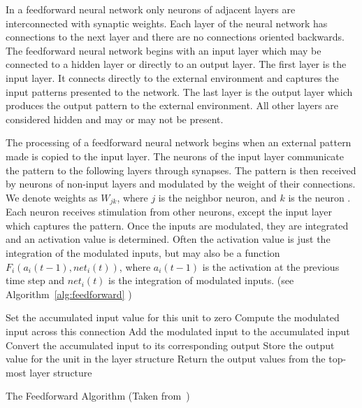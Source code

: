 \documentclass[11pt]{article}
\begin{document}
In a feedforward neural network only neurons of adjacent layers are interconnected with synaptic weights. Each layer of the neural
network has connections to the next layer and there are no connections oriented backwards. The feedforward neural network begins with an
input layer which may be connected to a hidden layer or directly to an output layer. The first layer is the input layer. It connects
directly to the external environment and captures the input patterns presented to the network. The last layer is the output layer which
produces the output pattern to the external environment. All other layers are considered hidden and may or may not be present.

The processing of a feedforward neural network begins when an external pattern made is copied to the input layer. The neurons of the
input layer communicate the pattern to the following layers through synapses. The pattern is then received by neurons of non-input
layers and modulated by the weight of their connections. We denote weights as $W_{jk}$, where $j$ is the neighbor neuron, and $k$ is the
neuron . Each neuron receives stimulation from other neurons, except the input layer which captures the pattern. Once the inputs are
modulated, they are integrated and an activation value is determined. Often the activation value is just the integration of the
modulated inputs, but may also be a function $F_{i}(a_{i}(t-1), net_{i}(t))$, where $a_{i}(t-1)$ is the activation at the previous time
step and $net_{i}(t)$ is the integration of modulated inputs. (see Algorithm~\ref{alg:feedforward}
)

\begin{algorithm}%
\dontprintsemicolon
{}
\SetLine
{}
{
	{
		Set the accumulated input value for this unit to zero\;
			{
				Compute the modulated input across this connection\;
				Add the modulated input to the accumulated input\;
			}
		Convert the accumulated input to its corresponding output\;
		Store the output value for the unit in the layer structure\;
	}
	Return the output values from the top-most layer structure\;
}

\caption{The Feedforward Algorithm (Taken from~\cite{skapura})}
\label{alg:feedforward}
\end{algorithm}
\end{document}
